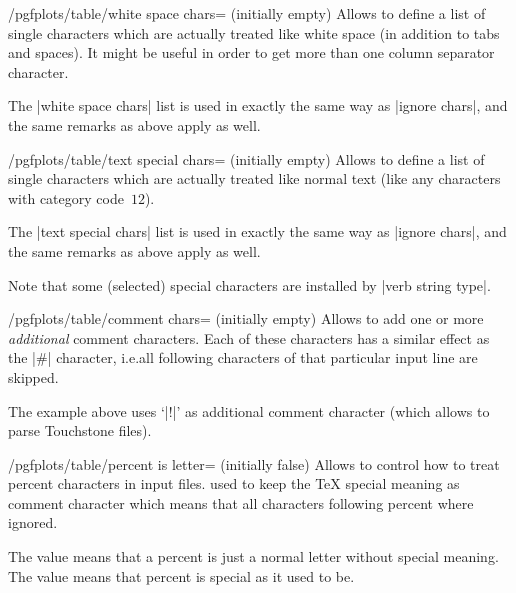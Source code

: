 \begin{key}{/pgfplots/table/white space chars= (initially empty)}
    Allows to define a list of single characters which are actually treated
    like white space (in addition to tabs and spaces). It might be useful in
    order to get more than one column separator character.

    The |white space chars| list is used in exactly the same way as
    |ignore chars|, and the same remarks as above apply as well.
\end{key}

\begin{key}{/pgfplots/table/text special chars= (initially empty)}
    Allows to define a list of single characters which are actually treated
    like normal text (like any characters with category code~$12$).

    The |text special chars| list is used in exactly the same way as
    |ignore chars|, and the same remarks as above apply as well.

    Note that some (selected) special characters are installed by
    |verb string type|.
\begin{codeexample}[pre={\begin{lateximage}},post={\end{lateximage}}]
\end{codeexample}
\end{key}

\begin{key}{/pgfplots/table/comment chars= (initially empty)}
    Allows to add one or more \emph{additional} comment characters. Each of
    these characters has a similar effect as the |#| character, i.e.\@ all
    following characters of that particular input line are skipped.
\begin{codeexample}[pre={\begin{lateximage}},post={\end{lateximage}}]
\end{codeexample}
    The example above uses `|!|' as additional comment character (which allows
    to parse Touchstone files).
\end{key}

\begin{key}{/pgfplots/table/percent is letter= (initially false)}
    Allows to control how to treat percent characters in input files.
    \PGFPlotstable{} used to keep the \TeX{} special meaning as comment
    character which means that all characters following percent where ignored.

    The value  means that a percent is just a normal letter
    without special meaning. The value  means that percent
    is special as it used to be.
\end{key}

